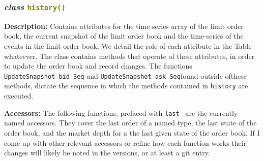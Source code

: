 
\subsubsection{\textit{class} \textcolor{olive}{\texttt{history()}}}\hfill \break
\textbf{Description:} Contains attributes for the time series array of the limit order book, the current snapshot of the limit order book and the time-series of the events in the limit order book. We detail the role of each attribute in the Table whateever. The class contains methods that operate of these attributes, in order to update the order book and record changes. The functions \texttt{UpdateSnapshot\_bid\_Seq} and \texttt{UpdateSnapshot\_ask\_Seq}found outside ofthese methods, dictate the sequence in which the methods contained in \texttt{history} are executed.


\cleardoublepage


\cleardoublepage


\cleardoublepage


\cleardoublepage


\cleardoublepage


\cleardoublepage


\cleardoublepage


\cleardoublepage


\cleardoublepage


\cleardoublepage


\cleardoublepage


\cleardoublepage


\cleardoublepage


\cleardoublepage


\noindent\textbf{Accessors:} The following functions, prefaced with \texttt{last\_} are the currently named accessors. They cover the last order of a named type, the last state of the order book, and the market depth for a the last given state of the order book. If I come up with other relevant accessors or refine how each function works their changes will likely be noted in the versions, or at least a git entry. 


\cleardoublepage
